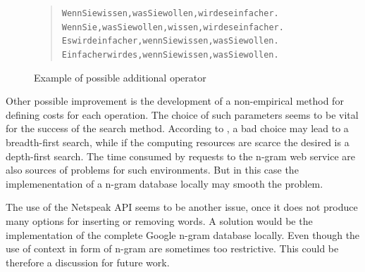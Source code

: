 \documentclass{reportAlternative}
\begin{document}
\begin{figure}[H]
\begin{quote}
\begin{alltt}
Wenn Sie wissen, was Sie wollen, wird es einfacher.
Wenn Sie, was Sie wollen, wissen, wird es einfacher.
Es wird einfacher, wenn Sie wissen, was Sie wollen.
Einfacher wird es, wenn Sie wissen, was Sie wollen.
\end{alltt}
\end{quote}
\caption{Example of possible additional operator}
\end{figure}

Other possible improvement is the development of a non-empirical method for defining costs for each operation. The choice of such parameters seems to be vital for the success of the search method. According to \cite[p.~2023]{Stein}, a bad choice may lead to a breadth-first search, while if the computing resources are scarce the desired is a depth-first search. The time consumed by requests to the n-gram web service are also sources of problems for such environments. But in this case the implemenentation of a n-gram database locally may smooth the problem. \par

The use of the Netspeak API seems to be another issue, once it does not produce many options for inserting or removing words. A solution would be the implementation of the complete Google n-gram database locally. Even though the use of context in form of n-gram are sometimes too restrictive. This could be therefore a discussion for future work.
\end{document}
